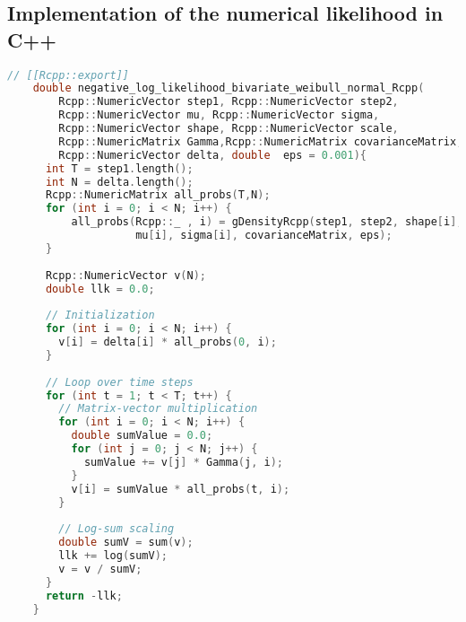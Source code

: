 \subsection{Implementation of the numerical likelihood in C++}
\begin{lstlisting}[language=C++]
    // [[Rcpp::export]]
    double negative_log_likelihood_bivariate_weibull_normal_Rcpp(
        Rcpp::NumericVector step1, Rcpp::NumericVector step2,
        Rcpp::NumericVector mu, Rcpp::NumericVector sigma,
        Rcpp::NumericVector shape, Rcpp::NumericVector scale,
        Rcpp::NumericMatrix Gamma,Rcpp::NumericMatrix covarianceMatrix,
        Rcpp::NumericVector delta, double  eps = 0.001){
      int T = step1.length();
      int N = delta.length();
      Rcpp::NumericMatrix all_probs(T,N);
      for (int i = 0; i < N; i++) {
          all_probs(Rcpp::_ , i) = gDensityRcpp(step1, step2, shape[i], scale[i],
                    mu[i], sigma[i], covarianceMatrix, eps);
      }
      
      Rcpp::NumericVector v(N);
      double llk = 0.0;
      
      // Initialization
      for (int i = 0; i < N; i++) {
        v[i] = delta[i] * all_probs(0, i);
      }
      
      // Loop over time steps
      for (int t = 1; t < T; t++) {
        // Matrix-vector multiplication
        for (int i = 0; i < N; i++) {
          double sumValue = 0.0;
          for (int j = 0; j < N; j++) {
            sumValue += v[j] * Gamma(j, i);
          }
          v[i] = sumValue * all_probs(t, i);
        }
        
        // Log-sum scaling
        double sumV = sum(v);
        llk += log(sumV);
        v = v / sumV;
      }
      return -llk;
    }    
\end{lstlisting}
\newpage
